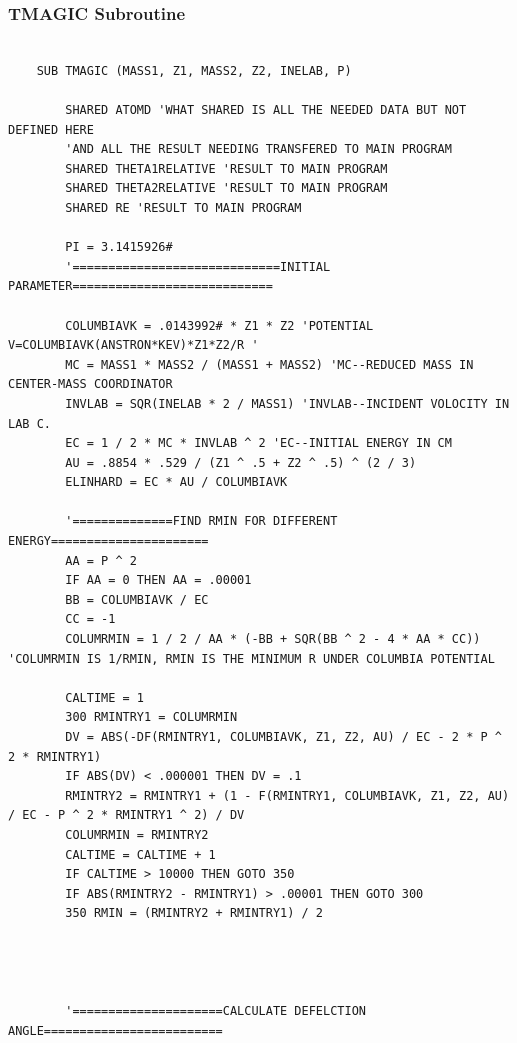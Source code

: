 \documentclass[10pt, reqno]{exam}
\begin{document}
\subsubsection{TMAGIC Subroutine}

\begin{verbatim}
    
    SUB TMAGIC (MASS1, Z1, MASS2, Z2, INELAB, P)
    
        SHARED ATOMD 'WHAT SHARED IS ALL THE NEEDED DATA BUT NOT DEFINED HERE
        'AND ALL THE RESULT NEEDING TRANSFERED TO MAIN PROGRAM
        SHARED THETA1RELATIVE 'RESULT TO MAIN PROGRAM
        SHARED THETA2RELATIVE 'RESULT TO MAIN PROGRAM
        SHARED RE 'RESULT TO MAIN PROGRAM
    
        PI = 3.1415926#
        '=============================INITIAL PARAMETER============================
    
        COLUMBIAVK = .0143992# * Z1 * Z2 'POTENTIAL V=COLUMBIAVK(ANSTRON*KEV)*Z1*Z2/R '
        MC = MASS1 * MASS2 / (MASS1 + MASS2) 'MC--REDUCED MASS IN CENTER-MASS COORDINATOR
        INVLAB = SQR(INELAB * 2 / MASS1) 'INVLAB--INCIDENT VOLOCITY IN LAB C.
        EC = 1 / 2 * MC * INVLAB ^ 2 'EC--INITIAL ENERGY IN CM
        AU = .8854 * .529 / (Z1 ^ .5 + Z2 ^ .5) ^ (2 / 3)
        ELINHARD = EC * AU / COLUMBIAVK
    
        '==============FIND RMIN FOR DIFFERENT ENERGY======================
        AA = P ^ 2
        IF AA = 0 THEN AA = .00001
        BB = COLUMBIAVK / EC
        CC = -1
        COLUMRMIN = 1 / 2 / AA * (-BB + SQR(BB ^ 2 - 4 * AA * CC)) 'COLUMRMIN IS 1/RMIN, RMIN IS THE MINIMUM R UNDER COLUMBIA POTENTIAL
    
        CALTIME = 1
        300 RMINTRY1 = COLUMRMIN
        DV = ABS(-DF(RMINTRY1, COLUMBIAVK, Z1, Z2, AU) / EC - 2 * P ^ 2 * RMINTRY1)
        IF ABS(DV) < .000001 THEN DV = .1
        RMINTRY2 = RMINTRY1 + (1 - F(RMINTRY1, COLUMBIAVK, Z1, Z2, AU) / EC - P ^ 2 * RMINTRY1 ^ 2) / DV
        COLUMRMIN = RMINTRY2
        CALTIME = CALTIME + 1
        IF CALTIME > 10000 THEN GOTO 350
        IF ABS(RMINTRY2 - RMINTRY1) > .00001 THEN GOTO 300
        350 RMIN = (RMINTRY2 + RMINTRY1) / 2
    
    
    
    
        '=====================CALCULATE DEFELCTION ANGLE=========================
    
    
    

\end{verbatim}
\end{document}
